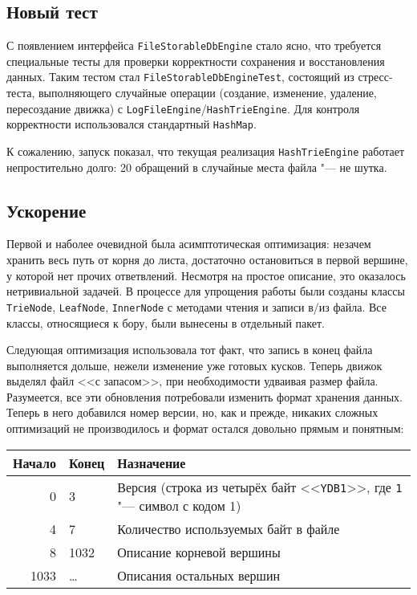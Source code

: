 \documentclass[a4paper]{article}
\renewcommand{\t}{\texttt}
\begin{document}
\subsection{Новый тест}
  С появлением интерфейса \t{FileStorableDbEngine} стало ясно, что требуется специальные тесты для проверки
  корректности сохранения и восстановления данных. Таким тестом стал \t{FileStorableDbEngineTest}, состоящий
  из стресс-теста, выполняющего случайные операции (создание, изменение, удаление, пересоздание движка)
  с \t{LogFileEngine}/\t{HashTrieEngine}. Для контроля корректности использовался стандартный \t{HashMap}.

  К сожалению, запуск показал, что текущая реализация \t{HashTrieEngine} работает непростительно
  долго: 20 обращений в случайные места файла "--- не шутка.

\subsection{Ускорение}
  Первой и наболее очевидной была асимптотическая оптимизация: незачем хранить весь путь от корня до листа,
  достаточно остановиться в первой вершине, у которой нет прочих ответвлений. Несмотря на простое описание,
  это оказалось нетривиальной задачей. В процессе для упрощения работы были созданы классы \t{TrieNode}, \t{LeafNode},
  \t{InnerNode} с методами чтения и записи в/из файла. Все классы, относящиеся к бору, были вынесены в отдельный пакет.

  Следующая оптимизация использовала тот факт, что запись в конец файла выполняется дольше, нежели изменение
  уже готовых кусков. Теперь движок выделял файл <<с запасом>>, при необходимости удваивая размер файла.
  Разумеется, все эти обновления потребовали изменить формат хранения данных. Теперь в него добавился номер версии,
  но, как и прежде, никаких сложных оптимизаций не производилось и формат остался довольно прямым и понятным:

  \begin{tabular}{|r|l|l|}
    \hline
    Начало & Конец & Назначение \\ \hline
    0 & 3 & Версия (строка из четырёх байт <<\t{YDB1}>>, где \t{1} "--- символ с кодом 1) \\ \hline
    4 & 7 & Количество используемых байт в файле \\ \hline
    8 & 1032 & Описание корневой вершины \\ \hline
    1033 & \dots & Описания остальных вершин \\ \hline
  \end{tabular}
\end{document}

